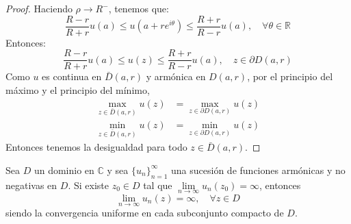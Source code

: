 \begin{proof}
    Haciendo $\rho \to R^-$, tenemos que:
    $$\frac{R-r}{R+r}u(a) \leq u(a+re^{i\theta}) \leq \frac{R+r}{R-r}u(a), \quad \forall \theta \in \mathbb{R}$$
    Entonces:
    $$\frac{R-r}{R+r}u(a) \leq u(z) \leq \frac{R+r}{R-r}u(a), \quad z \in \partial D(a, r)$$
    Como $u$ es continua en $\bar{D}(a, r)$ y armónica en $D(a, r)$, por el principio del máximo y el principio del mínimo,
    \begin{align*}
        \max_{z \in \bar{D}(a, r)} u(z) & = \max_{z \in \partial D(a, r)} u(z) \\
        \min_{z \in \bar{D}(a, r)} u(z) & = \min_{z \in \partial D(a, r)} u(z)
    \end{align*}
    Entonces tenemos la desigualdad para todo $z \in \bar{D}(a, r)$.
\end{proof}

\begin{proposition}
    Sea $D$ un dominio en $\mathbb{C}$ y sea $\{u_n\}_{n=1}^\infty$ una sucesión de funciones armónicas y no negativas en $D$.
    Si existe $z_0 \in D$ tal que $\lim\limits_{n \to \infty} u_n(z_0) = \infty$, entonces
    $$\lim_{n \to \infty} u_n(z) = \infty, \quad \forall z \in D$$
    siendo la convergencia uniforme en cada subconjunto compacto de $D$.
\end{proposition}

